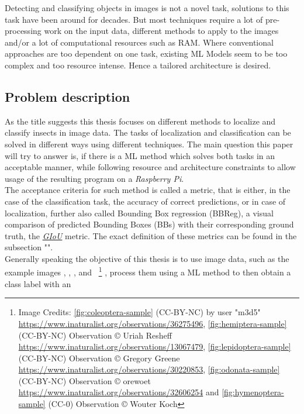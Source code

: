 Detecting and classifying objects in images is not a novel task, solutions to this task have been around for decades.
But most techniques require a lot of pre-processing work on the input data, different methods to apply to the images and/or a lot of computational resources such as RAM.
Where conventional approaches are too dependent on one task, existing ML Models seem to be too complex and too resource intense. Hence a tailored architecture is desired.

\subsection{Problem description}\label{subsec:problem-description}
As the title suggests this thesis focuses on different methods to localize and classify insects in image data.
The tasks of localization and classification can be solved in different ways using different techniques.
The main question this paper will try to answer is, if there is a ML method which solves both tasks in an acceptable manner, while following resource and architecture constraints to allow usage of the resulting program on a \textit{Raspberry Pi}.\\
The acceptance criteria for such method is called a metric, that is either, in the case of the classification task, the accuracy of correct predictions, or in case of localization, further also called Bounding Box regression (BBReg), a visual comparison of predicted Bounding Boxes (BBs) with their corresponding ground truth, the \hyperref[eq:giou]{\textit{GIoU}} metric. The exact definition of these metrics can be found in the subsection "".\\
Generally speaking the objective of this thesis is to use image data, such as the example images
, , ,  and 
~\footnote{Image Credits:
\ref{fig:coleoptera-sample} (CC-BY-NC) by user "m3d5" \url{https://www.inaturalist.org/observations/36275496},
\ref{fig:hemiptera-sample} (CC-BY-NC) Observation © Uriah Resheff  \url{https://www.inaturalist.org/observations/13067479},
\ref{fig:lepidoptera-sample}(CC-BY-NC) Observation © Gregory Greene \url{https://www.inaturalist.org/observations/30220853},
\ref{fig:odonata-sample} (CC-BY-NC) Observation © orewoet \url{https://www.inaturalist.org/observations/32606254} and
\ref{fig:hymenoptera-sample} (CC-0) Observation © Wouter Koch}
, process them using a ML method to then obtain a class label with an
